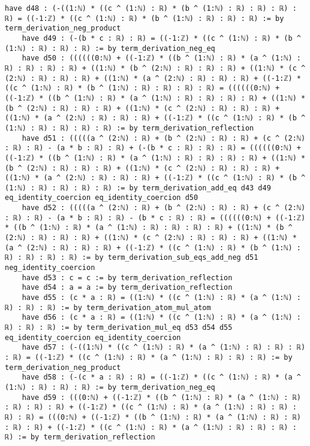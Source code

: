 \documentclass{article}
\begin{document}
\begin{tcolorbox}[colback=white!10, width=\linewidth]
\begin{lstlisting}[language=Lean4]
    have d48 : (-((1:ℕ) * ((c ^ (1:ℕ) : ℝ) * (b ^ (1:ℕ) : ℝ) : ℝ) : ℝ) : ℝ) = ((-1:ℤ) * ((c ^ (1:ℕ) : ℝ) * (b ^ (1:ℕ) : ℝ) : ℝ) : ℝ) := by term_derivation_neg_product
    have d49 : (-(b * c : ℝ) : ℝ) = ((-1:ℤ) * ((c ^ (1:ℕ) : ℝ) * (b ^ (1:ℕ) : ℝ) : ℝ) : ℝ) := by term_derivation_neg_eq
    have d50 : ((((((0:ℕ) + ((-1:ℤ) * ((b ^ (1:ℕ) : ℝ) * (a ^ (1:ℕ) : ℝ) : ℝ) : ℝ) : ℝ) + ((1:ℕ) * (b ^ (2:ℕ) : ℝ) : ℝ) : ℝ) + ((1:ℕ) * (c ^ (2:ℕ) : ℝ) : ℝ) : ℝ) + ((1:ℕ) * (a ^ (2:ℕ) : ℝ) : ℝ) : ℝ) + ((-1:ℤ) * ((c ^ (1:ℕ) : ℝ) * (b ^ (1:ℕ) : ℝ) : ℝ) : ℝ) : ℝ) = ((((((0:ℕ) + ((-1:ℤ) * ((b ^ (1:ℕ) : ℝ) * (a ^ (1:ℕ) : ℝ) : ℝ) : ℝ) : ℝ) + ((1:ℕ) * (b ^ (2:ℕ) : ℝ) : ℝ) : ℝ) + ((1:ℕ) * (c ^ (2:ℕ) : ℝ) : ℝ) : ℝ) + ((1:ℕ) * (a ^ (2:ℕ) : ℝ) : ℝ) : ℝ) + ((-1:ℤ) * ((c ^ (1:ℕ) : ℝ) * (b ^ (1:ℕ) : ℝ) : ℝ) : ℝ) : ℝ) := by term_derivation_reflection
    have d51 : (((((a ^ (2:ℕ) : ℝ) + (b ^ (2:ℕ) : ℝ) : ℝ) + (c ^ (2:ℕ) : ℝ) : ℝ) - (a * b : ℝ) : ℝ) + (-(b * c : ℝ) : ℝ) : ℝ) = ((((((0:ℕ) + ((-1:ℤ) * ((b ^ (1:ℕ) : ℝ) * (a ^ (1:ℕ) : ℝ) : ℝ) : ℝ) : ℝ) + ((1:ℕ) * (b ^ (2:ℕ) : ℝ) : ℝ) : ℝ) + ((1:ℕ) * (c ^ (2:ℕ) : ℝ) : ℝ) : ℝ) + ((1:ℕ) * (a ^ (2:ℕ) : ℝ) : ℝ) : ℝ) + ((-1:ℤ) * ((c ^ (1:ℕ) : ℝ) * (b ^ (1:ℕ) : ℝ) : ℝ) : ℝ) : ℝ) := by term_derivation_add_eq d43 d49 eq_identity_coercion eq_identity_coercion d50
    have d52 : (((((a ^ (2:ℕ) : ℝ) + (b ^ (2:ℕ) : ℝ) : ℝ) + (c ^ (2:ℕ) : ℝ) : ℝ) - (a * b : ℝ) : ℝ) - (b * c : ℝ) : ℝ) = ((((((0:ℕ) + ((-1:ℤ) * ((b ^ (1:ℕ) : ℝ) * (a ^ (1:ℕ) : ℝ) : ℝ) : ℝ) : ℝ) + ((1:ℕ) * (b ^ (2:ℕ) : ℝ) : ℝ) : ℝ) + ((1:ℕ) * (c ^ (2:ℕ) : ℝ) : ℝ) : ℝ) + ((1:ℕ) * (a ^ (2:ℕ) : ℝ) : ℝ) : ℝ) + ((-1:ℤ) * ((c ^ (1:ℕ) : ℝ) * (b ^ (1:ℕ) : ℝ) : ℝ) : ℝ) : ℝ) := by term_derivation_sub_eqs_add_neg d51 neg_identity_coercion
    have d53 : c = c := by term_derivation_reflection
    have d54 : a = a := by term_derivation_reflection
    have d55 : (c * a : ℝ) = ((1:ℕ) * ((c ^ (1:ℕ) : ℝ) * (a ^ (1:ℕ) : ℝ) : ℝ) : ℝ) := by term_derivation_atom_mul_atom
    have d56 : (c * a : ℝ) = ((1:ℕ) * ((c ^ (1:ℕ) : ℝ) * (a ^ (1:ℕ) : ℝ) : ℝ) : ℝ) := by term_derivation_mul_eq d53 d54 d55 eq_identity_coercion eq_identity_coercion
    have d57 : (-((1:ℕ) * ((c ^ (1:ℕ) : ℝ) * (a ^ (1:ℕ) : ℝ) : ℝ) : ℝ) : ℝ) = ((-1:ℤ) * ((c ^ (1:ℕ) : ℝ) * (a ^ (1:ℕ) : ℝ) : ℝ) : ℝ) := by term_derivation_neg_product
    have d58 : (-(c * a : ℝ) : ℝ) = ((-1:ℤ) * ((c ^ (1:ℕ) : ℝ) * (a ^ (1:ℕ) : ℝ) : ℝ) : ℝ) := by term_derivation_neg_eq
    have d59 : (((0:ℕ) + ((-1:ℤ) * ((b ^ (1:ℕ) : ℝ) * (a ^ (1:ℕ) : ℝ) : ℝ) : ℝ) : ℝ) + ((-1:ℤ) * ((c ^ (1:ℕ) : ℝ) * (a ^ (1:ℕ) : ℝ) : ℝ) : ℝ) : ℝ) = (((0:ℕ) + ((-1:ℤ) * ((b ^ (1:ℕ) : ℝ) * (a ^ (1:ℕ) : ℝ) : ℝ) : ℝ) : ℝ) + ((-1:ℤ) * ((c ^ (1:ℕ) : ℝ) * (a ^ (1:ℕ) : ℝ) : ℝ) : ℝ) : ℝ) := by term_derivation_reflection

\end{lstlisting}
\end{tcolorbox}
\end{document}
